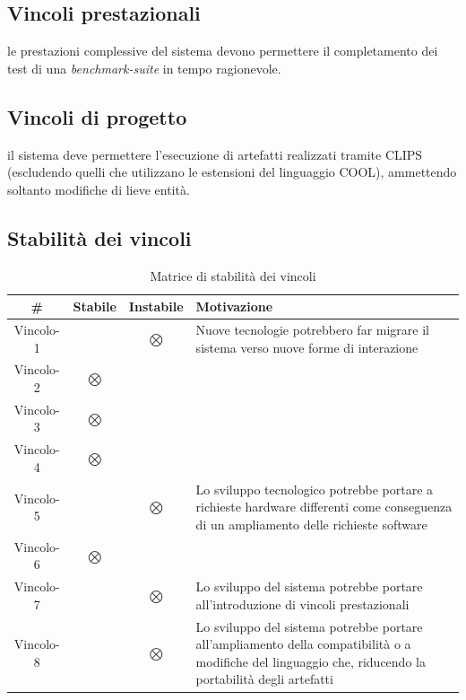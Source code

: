 \subsection{Vincoli prestazionali}
\vincolistart
	\item le prestazioni complessive del sistema devono permettere il completamento dei test di una \emph{benchmark-suite} in tempo ragionevole.
\vincoliend
\subsection{Vincoli di progetto}
\vincolistart
	\item il sistema deve permettere l'esecuzione di artefatti realizzati tramite CLIPS (escludendo quelli che utilizzano le estensioni del linguaggio COOL), ammettendo soltanto modifiche di lieve entità.
\vincoliend

\subsection{Stabilità dei vincoli}

\begin{table}[htbp]
\centering
\caption{Matrice di stabilità dei vincoli}\label{tab:stabilita-vincoli}
\begin{tabularx}{0.95\textwidth}{|c|c|c|X|}
\hline
\textbf{\#} & \textbf{Stabile} & \textbf{Instabile} & \textbf{Motivazione} \\ \hline\hline
Vincolo-1 &  & $\bigotimes$ & Nuove tecnologie potrebbero far migrare il sistema verso nuove forme di interazione \\ 
\hline 
Vincolo-2 & $\bigotimes$ &  &  \\ 
\hline 
Vincolo-3 & $\bigotimes$ & & \\ 
\hline 
Vincolo-4 & $\bigotimes$ & & \\ 
\hline 
Vincolo-5 &  & $\bigotimes$ & Lo sviluppo tecnologico potrebbe portare a richieste hardware differenti come conseguenza di un ampliamento delle richieste software \\ 
\hline 
Vincolo-6 & $\bigotimes$ & & \\ 
\hline 
Vincolo-7 & & $\bigotimes$ & Lo sviluppo del sistema potrebbe portare all'introduzione di vincoli prestazionali \\ 
\hline 
Vincolo-8 & & $\bigotimes$ & Lo sviluppo del sistema potrebbe portare all'ampliamento della compatibilità o a modifiche del linguaggio che, riducendo la portabilità degli artefatti\\ 
\hline
\end{tabularx} 
\end{table}

